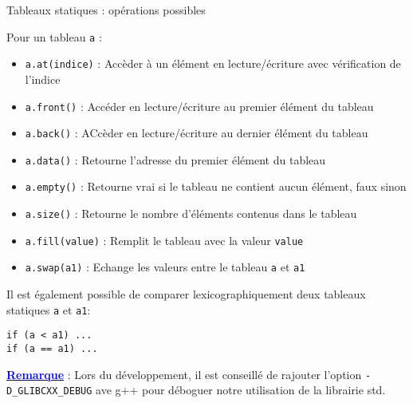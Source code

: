 \documentclass[compress,10pt,aspectratio=169]{beamer}
\begin{document}
\begin{frame}[fragile]{Tableaux statiques : opérations possibles}
    \scriptsize

    Pour un tableau \texttt{a} :
\begin{itemize}
\item \texttt{a.at(indice)} : Accèder à un élément en lecture/écriture avec vérification de l'indice
\item \texttt{a.front()} : Accéder en lecture/écriture au premier élément du tableau
\item \texttt{a.back()}  : ACcèder en lecture/écriture au dernier élément du tableau
\item \texttt{a.data()}  : Retourne l'adresse du premier élément du tableau
\item \texttt{a.empty()} : Retourne vrai si le tableau ne contient aucun élément, faux sinon
\item \texttt{a.size()}  : Retourne le nombre d'éléments contenus dans le tableau
\item \texttt{a.fill(value)} : Remplit le tableau avec la valeur \texttt{value}
\item \texttt{a.swap(a1)} : Echange les valeurs entre le tableau \texttt{a} et \texttt{a1}
\end{itemize}

Il est également possible de comparer lexicographiquement deux tableaux statiques \texttt{a} et \texttt{a1}:
\begin{verbatim}
if (a < a1) ...
if (a == a1) ...
\end{verbatim}
\underline{\textbf{\textcolor{blue}{Remarque}}} : Lors du développement, il est conseillé de rajouter l'option 
\texttt{-D\_GLIBCXX\_DEBUG} ave g++ pour déboguer notre utilisation de la librairie std.
\end{frame}
\end{document}
